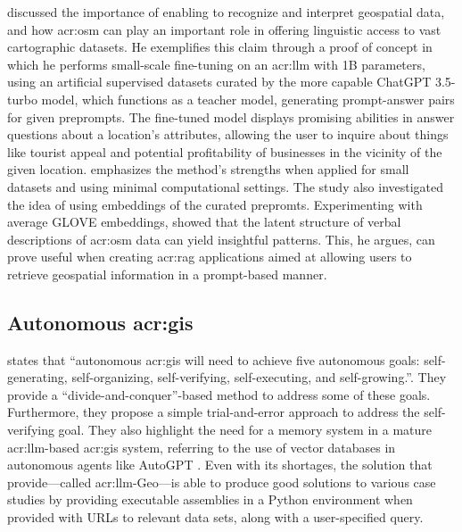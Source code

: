 \cite{unluChatmapLargeLanguage2023} discussed the importance of enabling  to recognize and interpret geospatial data, and how \gls{acr:osm} can play an important role in offering  linguistic access to vast cartographic datasets. He exemplifies this claim through a proof of concept in which he performs small-scale fine-tuning on an \acrshort{acr:llm} with 1B parameters, using an artificial supervised datasets curated by the more capable ChatGPT 3.5-turbo model, which functions as a teacher model, generating prompt-answer pairs for given preprompts. The fine-tuned model displays promising abilities in answer questions about a location's attributes, allowing the user to inquire about things like tourist appeal and potential profitability of businesses in the vicinity of the given location. \citeauthor{unluChatmapLargeLanguage2023} emphasizes the method's strengths when applied for small datasets and using minimal computational settings. The study also investigated the idea of using embeddings of the curated prepromts. Experimenting with average GLOVE embeddings, \citeauthor{unluChatmapLargeLanguage2023} showed that the latent structure of verbal descriptions of \gls{acr:osm} data can yield insightful patterns. This, he argues, can prove useful when creating \acrfull{acr:rag} applications aimed at allowing users to retrieve geospatial information in a prompt-based manner.

\subsection[Autonomous GIS]{Autonomous \acrshort{acr:gis}}

\cite{liAutonomousGISNextgeneration2023} states that \enquote{autonomous \acrshort{acr:gis} will need to achieve five autonomous goals: self-generating, self-organizing, self-verifying, self-executing, and self-growing.}. They provide a \enquote{divide-and-conquer}-based method to address some of these goals. Furthermore, they propose a simple trial-and-error approach to address the self-verifying goal. They also highlight the need for a memory system in a mature \acrshort{acr:llm}-based \acrshort{acr:gis} system, referring to the use of vector databases in autonomous agents like AutoGPT \citep{richardAutoGPTHeartOpensource2023}. Even with its shortages, the solution that \cite{liAutonomousGISNextgeneration2023} provide---called \acrshort{acr:llm}-Geo---is able to produce good solutions to various case studies by providing executable assemblies in a Python environment when provided with URLs to relevant data sets, along with a user-specified query.

